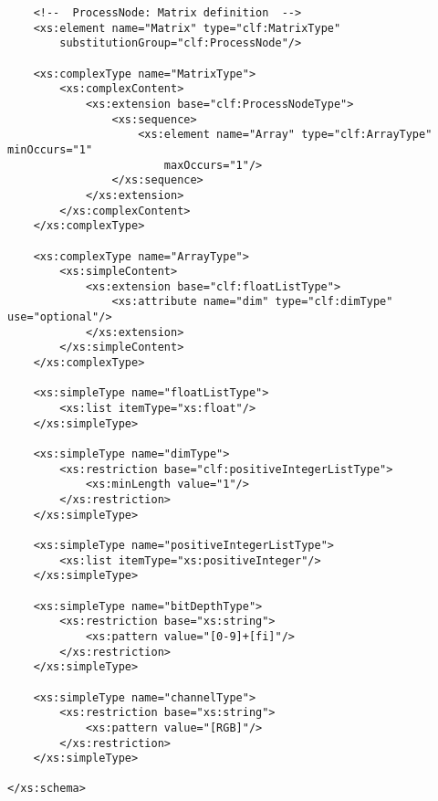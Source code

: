 \begin{lstlisting}
    <!--  ProcessNode: Matrix definition  -->
    <xs:element name="Matrix" type="clf:MatrixType" 
        substitutionGroup="clf:ProcessNode"/>
    
    <xs:complexType name="MatrixType">
        <xs:complexContent>
            <xs:extension base="clf:ProcessNodeType">
                <xs:sequence>
                    <xs:element name="Array" type="clf:ArrayType" minOccurs="1" 
                        maxOccurs="1"/>
                </xs:sequence>
            </xs:extension>
        </xs:complexContent>
    </xs:complexType>
    
    <xs:complexType name="ArrayType">
        <xs:simpleContent>
            <xs:extension base="clf:floatListType">
                <xs:attribute name="dim" type="clf:dimType" use="optional"/>
            </xs:extension>
        </xs:simpleContent>
    </xs:complexType>
        
    <xs:simpleType name="floatListType">
        <xs:list itemType="xs:float"/>
    </xs:simpleType>
    
    <xs:simpleType name="dimType">
        <xs:restriction base="clf:positiveIntegerListType">
            <xs:minLength value="1"/>
        </xs:restriction>
    </xs:simpleType>
    
    <xs:simpleType name="positiveIntegerListType">
        <xs:list itemType="xs:positiveInteger"/>
    </xs:simpleType>
    
    <xs:simpleType name="bitDepthType">
        <xs:restriction base="xs:string">
            <xs:pattern value="[0-9]+[fi]"/>
        </xs:restriction>
    </xs:simpleType>
    
    <xs:simpleType name="channelType">
        <xs:restriction base="xs:string">
            <xs:pattern value="[RGB]"/>
        </xs:restriction>
    </xs:simpleType>
    
</xs:schema>
\end{lstlisting}

